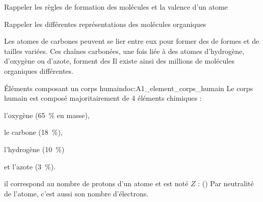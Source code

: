 \teteTermStssOrga
{}

\begin{objectifs}
  \item Rappeler les règles de formation des molécules et la valence d'un atome
  \item Rappeler les différentes représentations des molécules organiques
\end{objectifs}

\begin{contexte}
  Les atomes de carbones peuvent se lier entre eux pour former des  de formes et de tailles variées.
  Ces chaînes carbonées, une fois liée à des atomes d'hydrogène, d'oxygène ou d'azote, forment des 
  Il existe ainsi des millions de molécules organiques différentes.

\end{contexte}



\begin{doc}{Éléments composant un corps humain}{doc:A1_element_corps_humain}
  Le corps humain est composé majoritairement de 4 éléments chimiques :
  \vspace*{-4pt}
  \begin{listePoints}[2]
    \item l'oxygène   \oxygene (\qty{65}{\percent} en masse),
    \item le carbone  \carbone (\qty{18}{\percent}),
    \item l'hydrogène \hydrogene (\qty{10}{\percent})
    \item et l'azote   (\qty{3}{\percent}).
  \end{listePoints}
  
  \begin{importants}
     il correspond au nombre de protons d'un atome et est noté $Z$ :  (\hspace{-8pt}\exemple {})
    Par neutralité de l'atome, c'est aussi son nombre d'électrons.
  \end{importants}
\end{doc}

